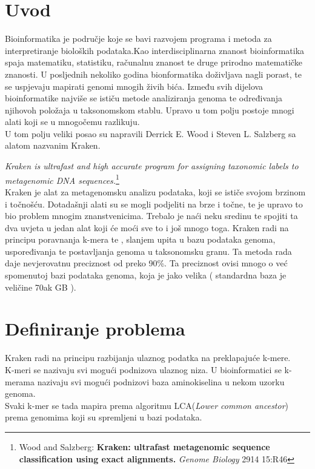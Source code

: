 \documentclass[times, utf8, zavrsni]{fer}
\begin{document}
\chapter{Uvod}
Bioinformatika je područje koje se bavi razvojem programa i metoda za interpretiranje bioloških podataka.Kao interdisciplinarna znanost bioinformatika spaja matematiku, statistiku, računalnu znanost te druge prirodno matematičke znanosti. U posljednih nekoliko godina bionformatika doživljava nagli porast, te se uspjevaju mapirati genomi mnogih živih bića. Između svih dijelova bioinformatike najviše se ističu metode analiziranja genoma te određivanja njihovoh položaja u taksonomskom stablu.
Upravo u tom polju postoje mnogi alati koji se u mnogočemu razlikuju.
\\ U tom polju veliki posao su napravili Derrick E. Wood i Steven L. Salzberg sa alatom nazvanim Kraken.\\{\textit{Kraken is ultrafast and high accurate program for assigning taxonomic labels to metagenomic DNA sequences.}\footnote[1]{Wood and Salzberg: \textbf{Kraken: ultrafast metagenomic sequence classification using exact alignments.} \textit{Genome Biology} 2914 15:R46}\\ Kraken je alat za metagenomsku analizu podataka,  koji se ističe svojom brzinom i točnošću. Dotadašnji alati su se mogli podjeliti na brze i točne, te je upravo to bio problem mnogim znanstvenicima. Trebalo je naći neku sredinu te spojiti ta dva uvjeta u jedan alat koji će moći sve to i još mnogo toga. Kraken radi na principu poravnanja k-mera te , slanjem upita u bazu podataka genoma, uspoređivanja te postavljanja genoma u taksonomsku granu. Ta metoda rada daje nevjerovatnu preciznost od preko 90\%. Ta preciznost ovisi mnogo o već spomenutoj bazi podataka genoma, koja je jako velika ( standardna baza je veličine 70ak GB ).



\chapter{Definiranje problema}
Kraken radi na principu razbijanja ulaznog podatka na preklapajuće k-mere.
\\K-meri se nazivaju svi mogući podnizova ulaznog niza. U bioinformatici se k-merama nazivaju svi mogući podnizovi baza aminokiselina u nekom uzorku genoma.
\\Svaki k-mer se tada mapira prema algoritmu LCA(\textit{Lower common ancestor}) prema genomima koji su spremljeni u bazi podataka.



}
\end{document}
